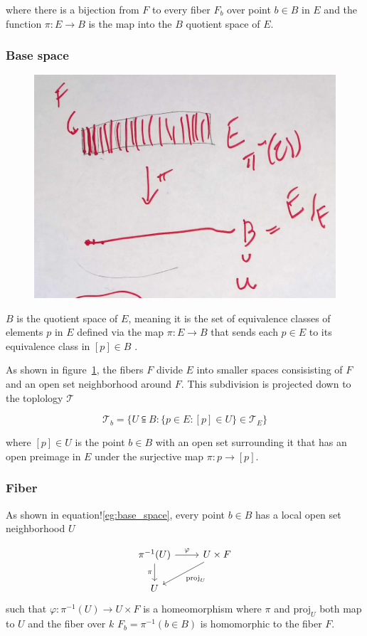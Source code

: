 \documentclass[../main.tex]{subfiles}
\begin{document}
where there is a bijection from $F$ to every fiber $F_b$ over point $b \in B$ in $E$ and the function $\pi: E \rightarrow B$ is the map into the $B$ quotient space of $E$.

\subsubsection{Base space}
\begin{figure}[ht]
    \includegraphics[width=0.4\linewidth]{figures/sections/math/k_qspace.png}
    \label{fig:kquote}
\end{figure}

$B$ is the quotient space of $E$, meaning it is the set of equivalence classes of elements $p$ in $E$ defined via the map $\pi: E \rightarrow B$ that sends each $p \in E$ to its equivalence class in $[p] \in B$ \cite{QuotientSpaceTopology2020,QuotientSpaceTopology2020}.

As shown in figure~\ref{fig:kquote}, the fibers $F$ divide $E$ into smaller spaces consisisting of $F$ and an open set neighborhood around $F$. This subdivision is projected down to the toplology $\mathcal{T}$

\begin{equation}
    \label{eq:base_space}
\mathcal{T}_b = \{U\subseteqq B: \{p \in E: [p] \in U\}\in \mathcal{T}_E\}
\end{equation}

where $[p] \in U$ is the point $b \in B$ with an open set surrounding it that has an open preimage in $E$ under the surjective map $\pi: p \rightarrow [p]$. 

\subsubsection{Fiber}
As shown in equation!\ref{eg:base_space}, every point $b \in B$ has a local open set neighborhood $U$ \cite{FiberBundle2020, rowlandFiberBundle}

\begin{equation}
    \begin{tikzcd}
        \pi^{-1}(U) \arrow[r, "\varphi"] \arrow[d, "\pi"'] & U \times F \arrow[ld, "\mathrm{proj}_U"] \\
        U                                                  &                                         
    \end{tikzcd}
    \label{eq:local_trivial}
\end{equation}
such that $\varphi: \pi^{-1}(U) \rightarrow U \times F$ is a homeomorphism where $\pi$ and $\mathrm{proj}_U$ both map to $U$ and the fiber over $k$ $F_b = \pi^{-1}({b \in B}) $ is homomorphic to the fiber $F$.
\end{document}
